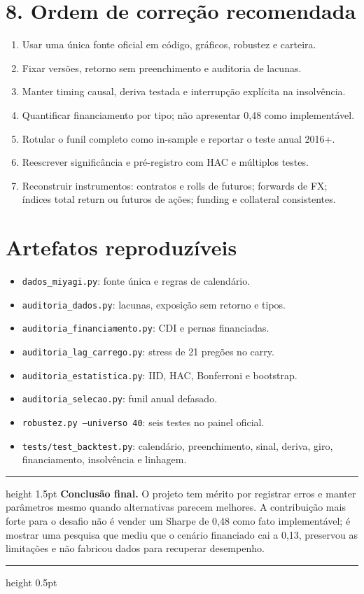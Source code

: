 \documentclass[10pt,a4paper]{article}
\newenvironment{callout}{\begin{center}\begin{minipage}{0.95\linewidth}\color{navy}\hrule height 1.5pt\vspace{2mm}\color{black}}{\vspace{1mm}\color{navy}\hrule height 0.5pt\end{minipage}\end{center}}
\begin{document}
\section*{8. Ordem de correção recomendada}
\begin{enumerate}
\item Usar uma única fonte oficial em código, gráficos, robustez e carteira.
\item Fixar versões, retorno sem preenchimento e auditoria de lacunas.
\item Manter timing causal, deriva testada e interrupção explícita na insolvência.
\item Quantificar financiamento por tipo; não apresentar 0,48 como implementável.
\item Rotular o funil completo como in-sample e reportar o teste anual 2016+.
\item Reescrever significância e pré-registro com HAC e múltiplos testes.
\item Reconstruir instrumentos: contratos e rolls de futuros; forwards de FX;
índices total return ou futuros de ações; funding e collateral consistentes.
\end{enumerate}

\section*{Artefatos reproduzíveis}
\begin{itemize}
\item \texttt{dados\_miyagi.py}: fonte única e regras de calendário.
\item \texttt{auditoria\_dados.py}: lacunas, exposição sem retorno e tipos.
\item \texttt{auditoria\_financiamento.py}: CDI e pernas financiadas.
\item \texttt{auditoria\_lag\_carrego.py}: stress de 21 pregões no carry.
\item \texttt{auditoria\_estatistica.py}: IID, HAC, Bonferroni e bootstrap.
\item \texttt{auditoria\_selecao.py}: funil anual defasado.
\item \texttt{robustez.py --universo 40}: seis testes no painel oficial.
\item \texttt{tests/test\_backtest.py}: calendário, preenchimento, sinal, deriva, giro,
financiamento, insolvência e linhagem.
\end{itemize}

\begin{callout}
\textbf{Conclusão final.} O projeto tem mérito por registrar erros e manter
parâmetros mesmo quando alternativas parecem melhores. A contribuição mais
forte para o desafio não é vender um Sharpe de 0,48 como fato implementável; é
mostrar uma pesquisa que mediu que o cenário financiado cai a 0,13, preservou
as limitações e não fabricou dados para recuperar desempenho.
\end{callout}
\end{document}
